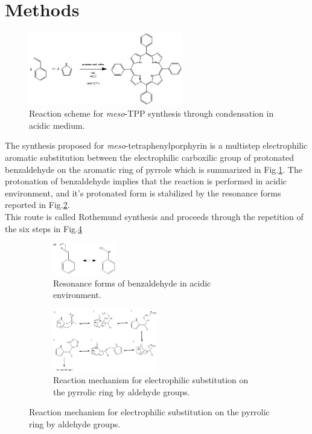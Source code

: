 \documentclass[num-refs]{wiley-article}
\begin{document}
\twocolumn
\section{Methods}
\begin{figure}[t!]
        \centering
        \includegraphics[width=0.6\textwidth]{reaction}
        \caption{Reaction scheme for \textit{meso}-TPP synthesis through condensation in acidic medium.}
        \label{reaction}
\end{figure}
The synthesis proposed for \textit{meso}-tetraphenylporphyrin is a multistep electrophilic aromatic substitution between the electrophilic carboxilic group of protonated benzaldehyde on the aromatic ring of pyrrole which is summarized in Fig.\ref{reaction}.
The protonation of benzaldehyde implies that the reaction is performed in acidic environment, and it's protonated form is stabilized by the resonance forms reported in Fig.\ref{res-benz}.\\
This route is called Rothemund synthesis and proceeds through the repetition of the six steps in Fig.\ref{mechanism}
\begin{figure}[b!]
    \centering
    \begin{subfigure}
        \centering
        \includegraphics[width=0.3\textwidth]{resonance-benzaldehyde}
        \caption{Resonance forms of benzaldehyde in acidic environment.}
        \label{res-benz}
    \end{subfigure}
    \begin{subfigure}
        \centering
        \includegraphics[width=0.5\textwidth]{mechanism}
        \caption{Reaction mechanism for electrophilic substitution on the pyrrolic ring by aldehyde groups.}
        \label{mechanism}
    \end{subfigure}
\end{figure}
\end{document}
